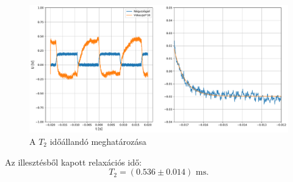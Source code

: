 \documentclass[12pt,a4paper]{article}
\begin{document}
\begin{figure}[!h]
\centering
\hspace*{-0.5cm}
\includegraphics[scale=0.45]{t2_ill}
\caption{A $T_2$ időállandó meghatározása}
\label{fig:illeszt2}
\end{figure}
 \newline
 Az illesztésből kapott relaxációs idő:
 $$T_2 = (0.536 \pm 0.014) \textrm{ ms} . $$
\end{document}
